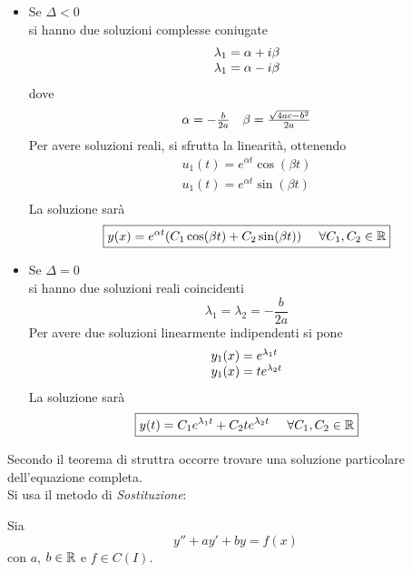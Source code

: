 \begin{itemize}
    \item Se $\Delta < 0$ \\
    si hanno due soluzioni complesse coniugate
    \[  \begin{array}{l l}
        \lambda_1 = \alpha + i \beta \\
        \lambda_1 = \alpha - i \beta 
    \end{array} \]
    dove \[ \begin{array}{l l} \alpha=-\frac{b}{2a} & \beta=\frac{\sqrt{4ac - b^2}}{2a} \end{array} \]
    Per avere soluzioni reali, si sfrutta la linearità, ottenendo
    \begin{equation}
        \begin{array}{l}
            u_1(t) = e^{\alpha t}\cos (\beta t) \\
            u_1(t) = e^{\alpha t}\sin (\beta t) \\
        \end{array}
    \end{equation}
    La soluzione sarà
    \begin{equation}
        \boxed{y(x) = e^{\alpha t}(C_1 \cos(\beta t) + C_2 \sin(\beta t) ) \mspace{25mu} \forall C_1, C_2 \in \mathbb{R}}
    \end{equation}
    \item Se $\Delta = 0$ \\
    si hanno due soluzioni reali coincidenti
    \[ \lambda_1 = \lambda_2 = -\frac{b}{2a}\]
    Per avere due soluzioni linearmente indipendenti si pone
    \begin{equation}
        \begin{array}{l l}
            y_1(x) = e^{\lambda_1 t} \\
            y_1(x) = t e^{\lambda_2 t} 
        \end{array} 
    \end{equation}
    La soluzione sarà
    \begin{equation}
        \boxed{y(t) = C_1 e^{\lambda_1 t} + C_2 t e^{\lambda_2 t} \mspace{25mu} \forall C_1, C_2 \in \mathbb{R}}
    \end{equation}
\end{itemize}

Secondo il teorema di struttra occorre trovare una soluzione particolare dell'equazione completa. \\
Si usa il metodo di \emph{Sostituzione}:
 
Sia 
\[ y'' +ay' + by = f(x)  \]
con $a$, $b \in \mathbb{R}$ e $f \in C(I)$.


